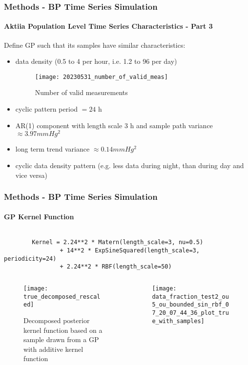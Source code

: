 \documentclass[
	8pt, %
]{beamer}
\begin{document}
\begin{frame}
	\frametitle{Methods - BP Time Series Simulation}
	\framesubtitle{Aktiia Population Level Time Series Characteristics - Part 3}

	Define GP such that its samples have similar characteristics:

	\begin{itemize}
		\item data density (0.5 to 4 per hour, i.e. 1.2 to 96 per day)
		\begin{figure}
			\texttt{[image: 20230531\_number\_of\_valid\_meas]}
			\caption{Number of valid measurements}
		\end{figure}
		\item cyclic pattern period $= 24$ h
		\item AR(1) component with length scale 3 h and sample path variance $\approx 3.97 mmHg^2$
		\item long term trend variance $\approx 0.14 mmHg^2$
		\item cyclic data density pattern (e.g. less data during night, than during day and vice versa)
	\end{itemize}

\end{frame}

\begin{frame}[fragile]
	\frametitle{Methods - BP Time Series Simulation}
	\framesubtitle{GP Kernel Function}

	\begin{verbatim}

		Kernel = 2.24**2 * Matern(length_scale=3, nu=0.5)
				+ 14**2 * ExpSineSquared(length_scale=3, periodicity=24)
				+ 2.24**2 * RBF(length_scale=50)

	\end{verbatim}

		\begin{columns}[c] %
		\begin{column}{0.45\textwidth} %
				\begin{figure}
					\texttt{[image: true\_decomposed\_rescaled]}
					\caption{Decomposed posterior kernel function based on a sample drawn from
					a GP with additive kernel function}
				\end{figure}
		\end{column}
		\begin{column}{0.5\textwidth} %
				\begin{figure}
					\texttt{[image: data\_fraction\_test2\_ou5\_ou\_bounded\_sin\_rbf\_07\_20\_07\_44\_36\_plot\_true\_with\_samples]}
				\end{figure}

		\end{column}
	\end{columns}

\end{frame}
\end{document}
